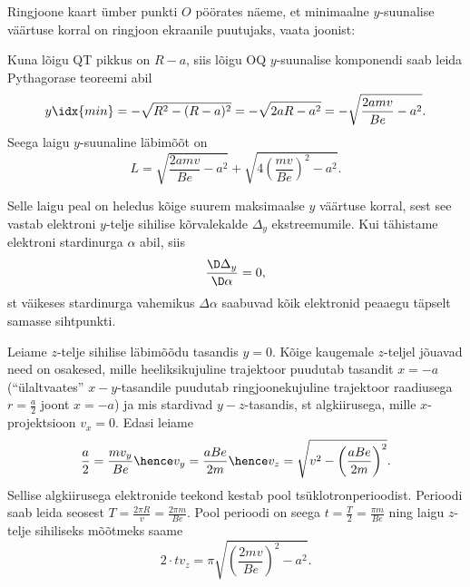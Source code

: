 \documentclass[11pt, twoside]{article}
\begin{document}
{{Ringjoone kaart ümber punkti $O$ pöörates näeme, et minimaalne $y$-suunalise väärtuse korral on ringjoon ekraanile puutujaks, vaata joonist:
\begin{center}
\end{center}
Kuna lõigu QT pikkus on $R-a$, siis lõigu OQ $y$-suunalise komponendi saab leida Pythagorase teoreemi abil
$$y\idx{min}=-\sqrt{R^2-(R-a)^2} = -\sqrt{2aR-a^2}=-\sqrt{\frac{2amv}{Be}-a^2}.$$
Seega laigu $y$-suunaline läbimõõt on
$$L=\sqrt{\frac{2amv}{Be}-a^2} + \sqrt{4\left(\frac{mv}{Be}\right)^2-a^2}.$$

Selle laigu peal on heledus kõige suurem maksimaalse $y$ väärtuse korral, sest see vastab elektroni $y$-telje sihilise kõrvalekalde $\Delta_y$ ekstreemumile. 
Kui tähistame elektroni stardinurga $\alpha$ abil, siis 
$$\frac{\D \Delta_y}{\D \alpha}=0,$$
st väikeses stardinurga vahemikus $\Delta\alpha$ saabuvad kõik elektronid peaaegu täpselt samasse sihtpunkti.

Leiame $z$-telje sihilise läbimõõdu tasandis $y=0$. Kõige kaugemale $z$-teljel jõuavad need on osakesed, mille 
heeliksikujuline trajektoor puudutab tasandit $x=-a$ (``ülaltvaates'' $x-y$-tasandile puudutab ringjoonekujuline trajektoor raadiusega $r=\frac a2$ 
joont $x=-a$) ja mis stardivad $y-z$-tasandis, st algkiirusega, mille $x$-projektsioon $v_x=0$.
Edasi leiame $$\frac a2=\frac {mv_y}{Be}\hence v_y=\frac{aBe}{2m}\hence v_z=\sqrt{v^2-\left(\frac{aBe}{2m}\right)^2}.$$
Sellise algkiirusega elektronide teekond kestab pool tsüklotronperioodist. Perioodi saab leida seosest $T=\frac{2\pi R}{v} = \frac{2\pi m}{Be}$. Pool perioodi on seega $t=\frac{T}{2}=\frac{\pi m}{Be}$ ning laigu $z$-telje sihiliseks 
mõõtmeks saame
$$2\cdot tv_z=\pi\sqrt{\left(\frac{2mv}{Be}\right)^2-a^2}.$$
\fi
}

}
\end{document}
